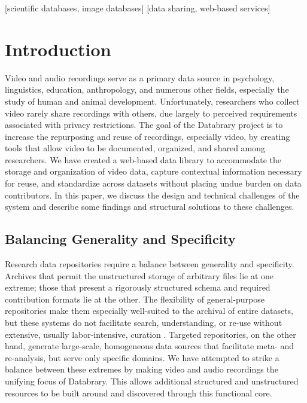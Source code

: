 \documentclass{sig-alternate}
\begin{document}
[scientific databases, image databases]
[data sharing, web-based services]



\section{Introduction}

Video and audio recordings serve as a primary data source in psychology, linguistics, education, anthropology, and numerous other fields, especially the study of human and animal development.
Unfortunately, researchers who collect video rarely share recordings with others, due largely to perceived requirements associated with privacy restrictions.
The goal of the Databrary project is to increase the repurposing and reuse of recordings, especially video, by creating tools that allow video to be documented, organized, and shared among researchers.
We have created a web-based data library to accommodate the storage and organization of video data, capture contextual information necessary for reuse, and standardize across datasets without placing undue burden on data contributors.
In this paper, we discuss the design and technical challenges of the system and describe some findings and structural solutions to these challenges.

\subsection{Balancing Generality and Specificity}

Research data repositories require a balance between generality and specificity.
Archives that permit the unstructured storage of arbitrary files lie at one extreme;
those that present a rigorously structured schema and required contribution formats lie at the other.
The flexibility of general-purpose repositories make them especially well-suited to the archival of entire datasets, but these systems do not facilitate search, understanding, or re-use without extensive, usually labor-intensive, curation \cite{Peer_2012}.
Targeted repositories, on the other hand, generate large-scale, homogeneous data sources that facilitate meta- and re-analysis, but serve only specific domains. 
We have attempted to strike a balance between these extremes by making video and audio recordings the unifying focus of Databrary. This allows additional structured and unstructured resources to be built around and discovered through this functional core.
\end{document}

